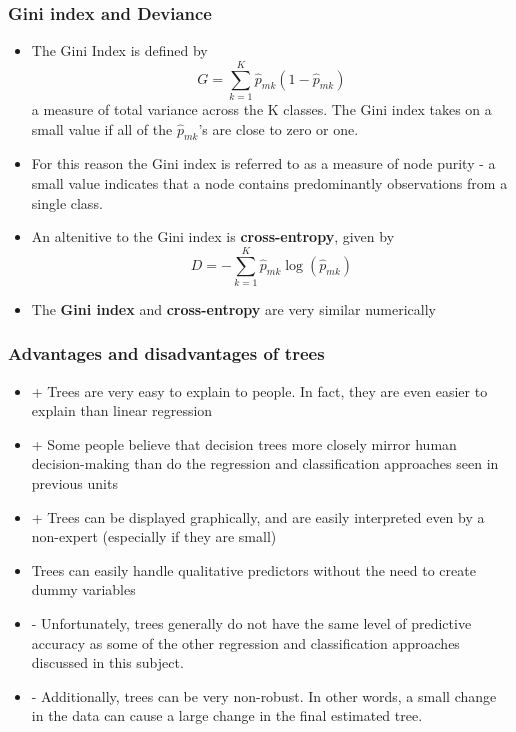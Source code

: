 \documentclass{article}
\begin{document}
\subsubsection{Gini index and Deviance}
\begin{itemize}
    \item The Gini Index is defined by
    \begin{equation*}
        G = \sum_{k=1}^K \hat{p}_{mk} (1 - \hat{p}_{mk})
    \end{equation*}
    a measure of total variance across the K classes. The Gini index takes on a small value if all of the $\hat{p}_{mk}$'s are close to zero or one.
    \item For this reason the Gini index is referred to as a measure of node purity - a small value indicates that a node contains predominantly observations from a single class.
    \item An altenitive to the Gini index is \textbf{cross-entropy}, given by 
    \begin{equation*}
        D = - \sum_{k=1}^K \hat{p}_{mk} \log(\hat{p}_{mk})
    \end{equation*}
    \item The \textbf{Gini index} and \textbf{cross-entropy} are very similar numerically
\end{itemize}


\subsubsection{Advantages and disadvantages of trees}
\begin{itemize}
    \item + Trees are very easy to explain to people. In fact, they are even easier to explain than linear regression
    \item + Some people believe that decision trees more closely mirror human decision-making than do the regression and classification approaches seen in previous units
    \item + Trees can be displayed graphically, and are easily interpreted even by a non-expert (especially if they are small)
    \item Trees can easily handle qualitative predictors without the need to create dummy variables
    \item - Unfortunately, trees generally do not have the same level of predictive accuracy as some of the other regression and classification approaches discussed in this subject.
    \item - Additionally, trees can be very non-robust. In other words, a small change in the data can cause a large change in the final estimated tree.
\end{itemize}
\end{document}
